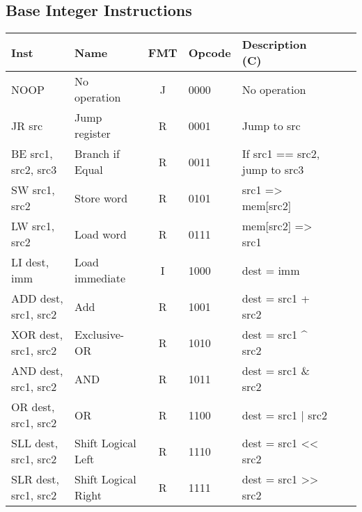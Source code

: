 \subsection*{Base Integer Instructions}
\begin{center}
\begin{tabular}
{| T | l | c | T | T | T | T } \hline
\rm Inst            & Name               & FMT & \rm Opcode & \rm Description (C)           \\ \hline
NOOP                & No operation       & J   & 0000       & No operation                  \\
JR src              & Jump register      & R   & 0001       & Jump to src                   \\
BE src1, src2, src3 & Branch if Equal    & R   & 0011       & If src1 == src2, jump to src3 \\
SW src1, src2       & Store word         & R   & 0101       & src1 => mem[src2]             \\
LW src1, src2       & Load word          & R   & 0111       & mem[src2] => src1             \\
LI dest, imm        & Load immediate     & I   & 1000       & dest = imm                    \\
ADD dest, src1, src2& Add                & R   & 1001       & dest = src1 + src2            \\
XOR dest, src1, src2& Exclusive-OR       & R   & 1010       & dest = src1 \^{} src2         \\
AND dest, src1, src2& AND                & R   & 1011       & dest = src1 \& src2           \\
OR dest, src1, src2 & OR                 & R   & 1100       & dest = src1 | src2            \\
SLL dest, src1, src2& Shift Logical Left & R   & 1110       & dest = src1 << src2           \\
SLR dest, src1, src2& Shift Logical Right& R   & 1111       & dest = src1 >> src2           \\
 \hline

\end{tabular}
\end{center}




